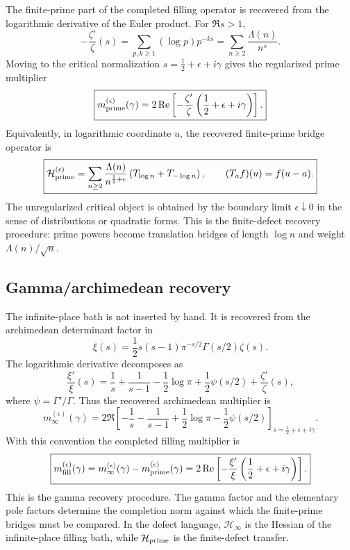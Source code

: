 \documentclass[11pt]{article}
\newcommand{\Hess}{\mathcal H}
\newcommand{\half}{\frac12}
\begin{document}
The finite-prime part of the completed filling operator is recovered from the logarithmic derivative of the Euler product. For $\Re s>1$,
\[
        -\frac{\zeta'}{\zeta}(s)
        =\sum_{p,k\ge1}(\log p)p^{-ks}
        =\sum_{n\ge2}\frac{\Lambda(n)}{n^s}.
\]
Moving to the critical normalization $s=\half+\epsilon+i\gamma$ gives the regularized prime multiplier
\[
\boxed{
        m_{\rm prime}^{(\epsilon)}(\gamma)
        =2\Re\left[-\frac{\zeta'}{\zeta}\left(\half+\epsilon+i\gamma\right)\right].
}
\]
Equivalently, in logarithmic coordinate $u$, the recovered finite-prime bridge operator is
\[
\boxed{
        \Hess_{\rm prime}^{(\epsilon)}
        =\sum_{n\ge2}\frac{\Lambda(n)}{n^{\half+\epsilon}}
        \left(T_{\log n}+T_{-\log n}\right),
        \qquad (T_a f)(u)=f(u-a).
}
\]
The unregularized critical object is obtained by the boundary limit $\epsilon\downarrow0$ in the sense of distributions or quadratic forms. This is the finite-defect recovery procedure: prime powers become translation bridges of length $\log n$ and weight $\Lambda(n)/\sqrt n$.

\subsection{Gamma/archimedean recovery}

The infinite-place bath is not inserted by hand. It is recovered from the archimedean determinant factor in
\[
        \xi(s)=\frac12 s(s-1)\pi^{-s/2}\Gamma(s/2)\zeta(s).
\]
The logarithmic derivative decomposes as
\[
\boxed{
        \frac{\xi'}{\xi}(s)
        =\frac1s+\frac1{s-1}
        -\frac12\log\pi
        +\frac12\psi(s/2)
        +\frac{\zeta'}{\zeta}(s),
}
\]
where $\psi=\Gamma'/\Gamma$. Thus the recovered archimedean multiplier is
\[
\boxed{
        m_\infty^{(\epsilon)}(\gamma)
        =2\Re\left[
        -\frac1s-\frac1{s-1}
        +\frac12\log\pi
        -\frac12\psi(s/2)
        \right]_{s=\half+\epsilon+i\gamma}.
}
\]
With this convention the completed filling multiplier is
\[
\boxed{
        m_{\rm fill}^{(\epsilon)}(\gamma)
        =m_\infty^{(\epsilon)}(\gamma)-m_{\rm prime}^{(\epsilon)}(\gamma)
        =2\Re\left[-\frac{\xi'}{\xi}\left(\half+\epsilon+i\gamma\right)\right].
}
\]
This is the gamma recovery procedure. The gamma factor and the elementary pole factors determine the completion norm against which the finite-prime bridges must be compared. In the defect language, $\Hess_\infty$ is the Hessian of the infinite-place filling bath, while $\Hess_{\rm prime}$ is the finite-defect transfer.
\end{document}
